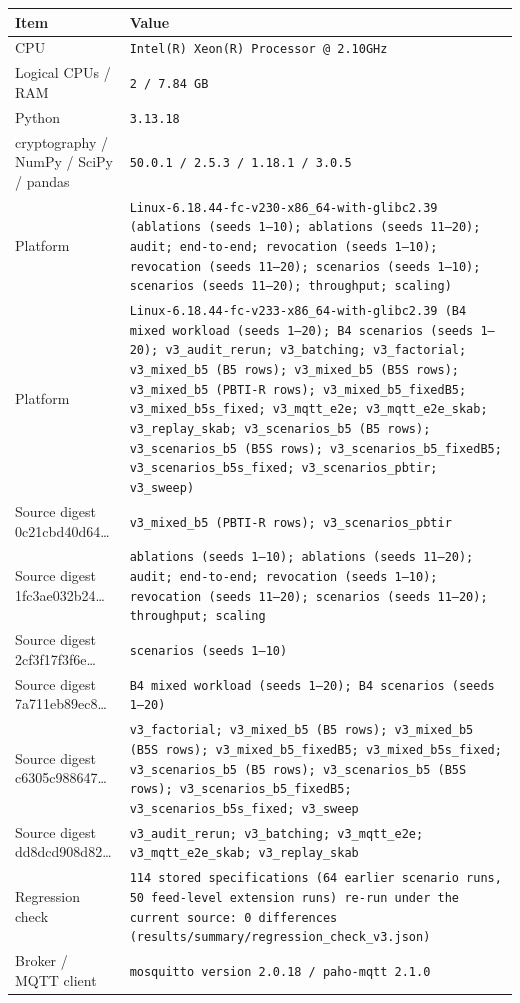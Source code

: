\begin{tabular}{p{4.1cm}p{11.4cm}}
\toprule
Item & Value\\
\midrule
CPU & \texttt{Intel(R) Xeon(R) Processor @ 2.10GHz}\\
Logical CPUs / RAM & \texttt{2 / 7.84 GB}\\
Python & \texttt{3.13.18}\\
cryptography / NumPy / SciPy / pandas & \texttt{50.0.1 / 2.5.3 / 1.18.1 / 3.0.5}\\
Platform & \texttt{Linux-6.18.44-fc-v230-x86\_64-with-glibc2.39 (ablations (seeds 1--10); ablations (seeds 11--20); audit; end-to-end; revocation (seeds 1--10); revocation (seeds 11--20); scenarios (seeds 1--10); scenarios (seeds 11--20); throughput; scaling)}\\
Platform & \texttt{Linux-6.18.44-fc-v233-x86\_64-with-glibc2.39 (B4 mixed workload (seeds 1--20); B4 scenarios (seeds 1--20); v3\_audit\_rerun; v3\_batching; v3\_factorial; v3\_mixed\_b5 (B5 rows); v3\_mixed\_b5 (B5S rows); v3\_mixed\_b5 (PBTI-R rows); v3\_mixed\_b5\_fixedB5; v3\_mixed\_b5s\_fixed; v3\_mqtt\_e2e; v3\_mqtt\_e2e\_skab; v3\_replay\_skab; v3\_scenarios\_b5 (B5 rows); v3\_scenarios\_b5 (B5S rows); v3\_scenarios\_b5\_fixedB5; v3\_scenarios\_b5s\_fixed; v3\_scenarios\_pbtir; v3\_sweep)}\\
Source digest 0c21cbd40d64\ldots & \texttt{v3\_mixed\_b5 (PBTI-R rows); v3\_scenarios\_pbtir}\\
Source digest 1fc3ae032b24\ldots & \texttt{ablations (seeds 1--10); ablations (seeds 11--20); audit; end-to-end; revocation (seeds 1--10); revocation (seeds 11--20); scenarios (seeds 11--20); throughput; scaling}\\
Source digest 2cf3f17f3f6e\ldots & \texttt{scenarios (seeds 1--10)}\\
Source digest 7a711eb89ec8\ldots & \texttt{B4 mixed workload (seeds 1--20); B4 scenarios (seeds 1--20)}\\
Source digest c6305c988647\ldots & \texttt{v3\_factorial; v3\_mixed\_b5 (B5 rows); v3\_mixed\_b5 (B5S rows); v3\_mixed\_b5\_fixedB5; v3\_mixed\_b5s\_fixed; v3\_scenarios\_b5 (B5 rows); v3\_scenarios\_b5 (B5S rows); v3\_scenarios\_b5\_fixedB5; v3\_scenarios\_b5s\_fixed; v3\_sweep}\\
Source digest dd8dcd908d82\ldots & \texttt{v3\_audit\_rerun; v3\_batching; v3\_mqtt\_e2e; v3\_mqtt\_e2e\_skab; v3\_replay\_skab}\\
Regression check & \texttt{114 stored specifications (64 earlier scenario runs, 50 feed-level extension runs) re-run under the current source: 0 differences (results/summary/regression\_check\_v3.json)}\\
Broker / MQTT client & \texttt{mosquitto version 2.0.18 / paho-mqtt 2.1.0}\\
\bottomrule
\end{tabular}